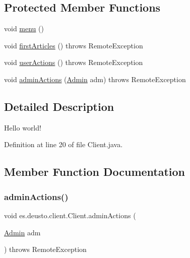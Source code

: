 \subsection*{Protected Member Functions}
\begin{DoxyCompactItemize}
\item 
void \hyperlink{classes_1_1deusto_1_1client_1_1_client_a8fdee4eb01bf96421c91a0bc1fbdcb43}{menu} ()
\item 
void \hyperlink{classes_1_1deusto_1_1client_1_1_client_a1872e2d941c7f50c6cc13d80e8d28eef}{first\+Articles} ()  throws Remote\+Exception 
\item 
void \hyperlink{classes_1_1deusto_1_1client_1_1_client_a08731e01aee74e27a7a55ae48c636c84}{user\+Actions} ()  throws Remote\+Exception 
\item 
void \hyperlink{classes_1_1deusto_1_1client_1_1_client_aee57ed402853cda15cc53f102d6abf1c}{admin\+Actions} (\hyperlink{classes_1_1deusto_1_1server_1_1jdo_1_1_admin}{Admin} adm)  throws Remote\+Exception 
\end{DoxyCompactItemize}


\subsection{Detailed Description}
Hello world! 

Definition at line 20 of file Client.\+java.



\subsection{Member Function Documentation}
\mbox{\label{classes_1_1deusto_1_1client_1_1_client_aee57ed402853cda15cc53f102d6abf1c}} 
\subsubsection{\texorpdfstring{admin\+Actions()}{adminActions()}}
{\footnotesize\ttfamily void es.\+deusto.\+client.\+Client.\+admin\+Actions (\begin{DoxyParamCaption}\item[{\hyperlink{classes_1_1deusto_1_1server_1_1jdo_1_1_admin}{Admin}}]{adm }\end{DoxyParamCaption}) throws Remote\+Exception\hspace{0.3cm}{\ttfamily [protected]}}



